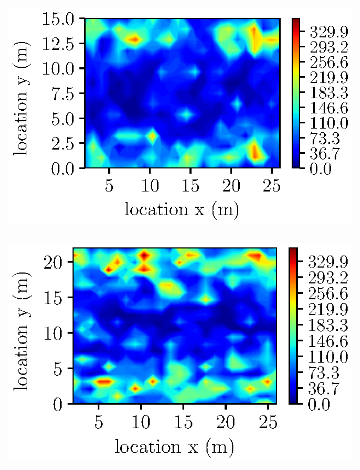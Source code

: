 \begin{figure}[htbp!]
\begin{subfigure}[b]{0.475\columnwidth}
            \label{abswg_width10}
        \end{subfigure}
        \begin{subfigure}[b]{0.475\columnwidth}  
            \centering
            \caption{} 
            \includegraphics[width=\textwidth]{plots/abswg_width15.eps}
            
            \label{abswg_width15}
        \end{subfigure}
        \begin{subfigure}[b]{0.475\columnwidth}   
            \centering 
            \caption{}            
            \includegraphics[width=\textwidth]{plots/abswg_width22.eps}
        
            \label{abswg_width22}
           \end{subfigure}     
 \caption{} 
 \label{abswg}

\end{figure}




